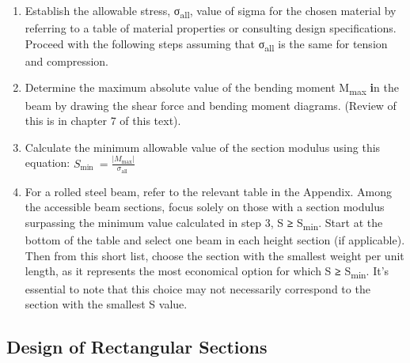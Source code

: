 \documentclass[
  letterpaper,
  DIV=11,
  numbers=noendperiod]{scrreprt}
\providecommand{\tightlist}{%
  \setlength{\itemsep}{0pt}\setlength{\parskip}{0pt}}\usepackage{longtable,booktabs,array}
\begin{document}
\begin{tcolorbox}[enhanced jigsaw, breakable, opacityback=0, toptitle=1mm, left=2mm, colback=white, opacitybacktitle=0.6, colframe=quarto-callout-warning-color-frame, titlerule=0mm, arc=.35mm, leftrule=.75mm, bottomtitle=1mm, colbacktitle=quarto-callout-warning-color!10!white, rightrule=.15mm, title=\textcolor{quarto-callout-warning-color}{\faExclamationTriangle}\hspace{0.5em}{Step-by-step: Most Economical Beam Design (standard shapes)}, bottomrule=.15mm, toprule=.15mm, coltitle=black]

\begin{enumerate}
\def\labelenumi{\arabic{enumi}.}
\tightlist
\item
  Establish the allowable stress, σ\textsubscript{all}, value of sigma
  for the chosen material by referring to a table of material properties
  or consulting design specifications. Proceed with the following steps
  assuming that σ\textsubscript{all} is the same for tension and
  compression.
\item
  Determine the maximum absolute value of the bending moment
  \textbar M\textsubscript{max}\textbar{} \textbf{i}n the beam by
  drawing the shear force and bending moment diagrams. (Review of this
  is in chapter 7 of this text).
\item
  Calculate the minimum allowable value of the section modulus using
  this equation:
  \(S_{\text {min }}=\frac{\left|M_{\max }\right|}{\sigma_{\text {all }}}\)
\item
  For a rolled steel beam, refer to the relevant table in the Appendix.
  Among the accessible beam sections, focus solely on those with a
  section modulus surpassing the minimum value calculated in step 3, S
  \textbf{≥} S\textsubscript{min}. Start at the bottom of the table and
  select one beam in each height section (if applicable). Then from this
  short list, choose the section with the smallest weight per unit
  length, as it represents the most economical option for which S
  \textbf{≥} S\textsubscript{min}. It's essential to note that this
  choice may not necessarily correspond to the section with the smallest
  S value.
\end{enumerate}

\end{tcolorbox}

\subsection{Design of Rectangular
Sections}\label{design-of-rectangular-sections}
\end{document}
